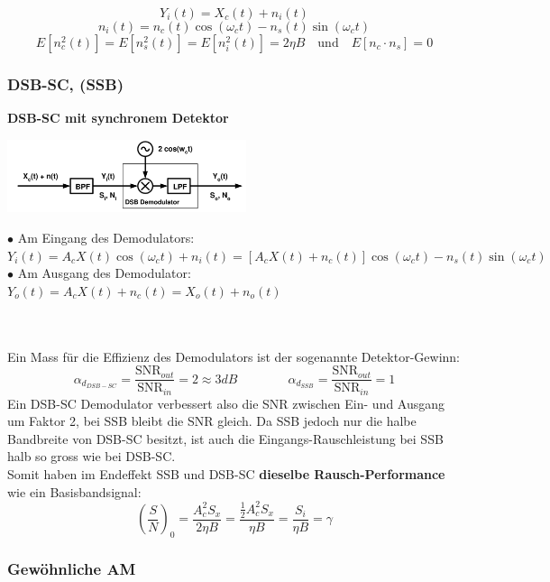 	$$ Y_i(t) = X_c(t) + n_i(t)$$
	$$n_i(t) = n_c(t) \cos(\omega_c t) - n_s(t) \sin(\omega_c t) $$
	$$ E[n_c^2(t)] = E[n_s^2(t)] = E[n_i^2(t)] = 2 \eta B \quad \text{und} \quad E[n_c\cdot n_s] = 0$$



\subsubsection{DSB-SC, (SSB) }
\textbf{DSB-SC mit synchronem Detektor}\\
\begin{minipage}{7.5cm}
	\includegraphics[width = 7cm]{./bilder/08_Sync_Detektor_DSB}
\end{minipage}
\begin{minipage}{11cm}
  $\bullet$ Am Eingang des Demodulators:\\ 
  \hspace*{0.3cm}$Y_i(t) = A_c X(t) \cos (\omega_c t) + n_i(t) = [A_c X(t) + n_c(t)]\cos(\omega_c t) - n_s(t)\sin(\omega_c t)$\\
  $\bullet$ Am Ausgang des Demodulator:\\ 
  \hspace*{0.3cm} $Y_o(t) = A_c X(t) + n_c(t) = X_o(t) + n_o(t)$
\end{minipage}\\ \\
Ein Mass für die Effizienz des Demodulators ist der sogenannte Detektor-Gewinn: \\
$$ \alpha_{d_{DSB-SC}} = \dfrac{\text{SNR}_{out}}{\text{SNR}_{in}} = 2 \approx 3 dB
\qquad \qquad
 \alpha_{d_{SSB}} = \dfrac{\text{SNR}_{out}}{\text{SNR}_{in}} = 1
$$
Ein DSB-SC Demodulator verbessert also die SNR zwischen Ein- und Ausgang um Faktor 2, bei SSB
bleibt die SNR gleich. Da SSB jedoch nur die halbe Bandbreite von DSB-SC besitzt, ist auch die
Eingangs-Rauschleistung bei SSB halb so gross wie bei DSB-SC. \\
Somit haben im Endeffekt SSB und DSB-SC \textbf{dieselbe Rausch-Performance} wie ein Basisbandsignal: 
	$$ \left(\dfrac{S}{N}\right)_0 =
	\dfrac{A_c^2 S_x}{2 \eta B} = \dfrac{\frac12 A_c^2 S_x}{\eta B} = \dfrac{S_i}{\eta B} = \gamma $$

\subsubsection{Gewöhnliche AM }

